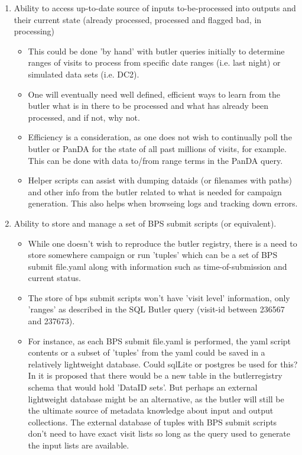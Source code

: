 \documentclass[DM,authoryear,toc]{lsstdoc}
\begin{document}
	\begin{enumerate}

	\item Ability to access up-to-date source of inputs to-be-processed
		into outputs and their current state 
		(already processed, processed and flagged bad, 
		in processing)

	\begin{itemize}
	
	\item This could be done 'by hand' with butler queries initially
	to determine ranges of visits to process from specific date
	ranges (i.e. last night) or simulated data sets (i.e. DC2).

	\item One will eventually need well defined, efficient ways
	to learn from the butler what is in there to be processed and
	what has already been processed, and if not, why not.
	
	\item Efficiency is a consideration, as one does not wish to
	continually poll the butler or PanDA for the state of all past 
	millions of visits, for example.  This can be done with data to/from
	range terms in the PanDA query.

	\item Helper scripts can assist with dumping dataids (or filenames
	with paths) and other info from the butler related to
	what is needed for campaign generation. This also helps when
	browseing logs and tracking down errors.

	\end{itemize}

	\item Ability to store and manage a set of BPS submit scripts 
	(or equivalent).

	\begin{itemize}

	\item While one doesn't wish to reproduce the butler registry, there
	is a need to store somewhere campaign or run 'tuples' which
	can be a set of BPS submit file.yaml along with information
	such as time-of-submission and current status.

	\item The store of bps submit scripts won't have 'visit level'
	information, only 'ranges' as described in the SQL Butler 
	query (visit-id between 236567 and 237673).

	\item For instance, as each BPS submit file.yaml is performed, the yaml
	script contents or a subset of 'tuples' from the yaml
	could be saved in a relatively lightweight database.  Could
	sqlLite or postgres be used for this?
	In \cite{DMTN-181} it is proposed that there would be a new table
	in the butlerregistry schema that would hold 'DataID sets'.  But
	perhaps an external lightweight database might be an alternative,
	as the butler will still be the ultimate source of metadata
	knowledge about input and output collections.  The external
	database of tuples with BPS submit scripts don't need to
	have exact visit lists so long as the query used to generate
	the input lists are available.


\end{itemize}
\end{enumerate}
\end{document}
